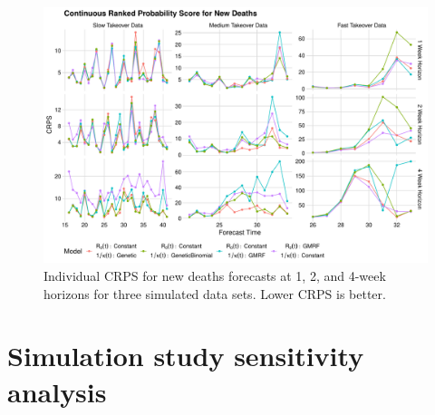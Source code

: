 \begin{figure}
    \centering
    \includegraphics[width=1.0\columnwidth]{simulated_crps_comparison_data_new_deaths_plot}
    \caption{Individual CRPS for new deaths forecasts at 1, 2, and 4-week horizons for three simulated data sets. Lower CRPS is better.}
    \label{ch_5:fig:simulated_crps_comparison_data_new_deaths_plot}
\end{figure}

\section{Simulation study sensitivity analysis}
\label{ch_5:sec:sim_sensitivity}